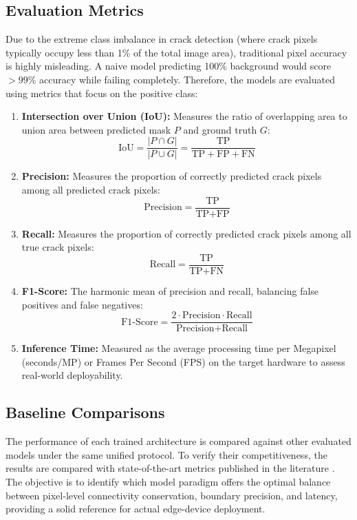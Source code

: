 \subsection{Evaluation Metrics}
\label{subsec:metrics}
Due to the extreme class imbalance in crack detection (where crack pixels typically occupy less than 1\% of the total image area), traditional pixel accuracy is highly misleading. A naive model predicting 100\% background would score $>99\%$ accuracy while failing completely. Therefore, the models are evaluated using metrics that focus on the positive class:
\begin{enumerate}
    \item \textbf{Intersection over Union (IoU):} Measures the ratio of overlapping area to union area between predicted mask $P$ and ground truth $G$:
          \begin{equation}
              \text{IoU} = \frac{|P \cap G|}{|P \cup G|} = \frac{\text{TP}}{\text{TP} + \text{FP} + \text{FN}}
          \end{equation}
    \item \textbf{Precision:} Measures the proportion of correctly predicted crack pixels among all predicted crack pixels:
          \begin{equation}
              \text{Precision} = \frac{\text{TP}}{\text{TP} + \text{FP}}
          \end{equation}
    \item \textbf{Recall:} Measures the proportion of correctly predicted crack pixels among all true crack pixels:
          \begin{equation}
              \text{Recall} = \frac{\text{TP}}{\text{TP} + \text{FN}}
          \end{equation}
    \item \textbf{F1-Score:} The harmonic mean of precision and recall, balancing false positives and false negatives:
          \begin{equation}
              \text{F1-Score} = \frac{2 \cdot \text{Precision} \cdot \text{Recall}}{\text{Precision} + \text{Recall}}
          \end{equation}
    \item \textbf{Inference Time:} Measured as the average processing time per Megapixel (seconds/MP) or Frames Per Second (FPS) on the target hardware to assess real-world deployability.
\end{enumerate}

\subsection{Baseline Comparisons}

\hs The performance of each trained architecture is compared against other evaluated models under the same unified protocol. To verify their competitiveness, the results are compared with state-of-the-art metrics published in the literature \cite{liu-2019, zhang-2024c, sohaib-2024}. The objective is to identify which model paradigm offers the optimal balance between pixel-level connectivity conservation, boundary precision, and latency, providing a solid reference for actual edge-device deployment.